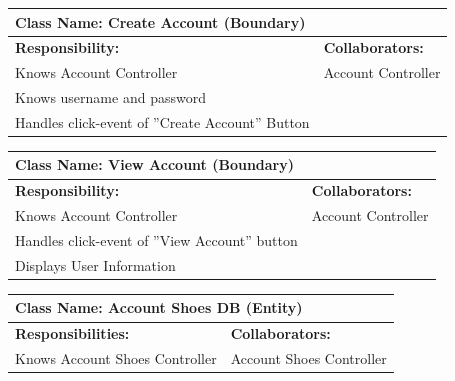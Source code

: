 \documentclass[]{article}
\begin{document}
\begin{table}[H]
    \centering
    \begin{tabular}{|p{}|p{}|}
        \hline
        \multicolumn{2}{|l|}{\textbf{Class Name:} Create Account (Boundary)} \\
        \hline
        \textbf{Responsibility:} & \textbf{Collaborators:} \\
        \hline
        Knows Account Controller & Account Controller \\
        Knows username and password &  \\
        Handles click-event of ”Create Account” Button & \\
        \hline
    \end{tabular}
    \label{tab:create_account}
\end{table}

\begin{table}[H]
    \centering
    \begin{tabular}{|p{}|p{}|}
        \hline
        \multicolumn{2}{|l|}{\textbf{Class Name:} View Account (Boundary)} \\
        \hline
        \textbf{Responsibility:} & \textbf{Collaborators:} \\
        \hline
        Knows Account Controller & Account Controller \\
        Handles click-event of ”View Account” button &  \\
        Displays User Information & \\
        \hline
    \end{tabular}
    \label{tab:view_account}
\end{table}

\begin{table}[H]
    \centering
    \begin{tabular}{|p{}|p{}|}
        \hline
        \multicolumn{2}{|l|}{\textbf{Class Name:} Account Shoes DB (Entity)} \\
        \hline
        \textbf{Responsibilities:} & \textbf{Collaborators:} \\
        \hline
        Knows Account Shoes Controller & Account Shoes Controller \\
        \hline
    \end{tabular}
    \label{tab:account_shoes_db}
\end{table}
\end{document}
